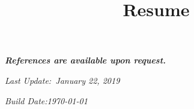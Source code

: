 \documentclass[12pt,a4paper]{moderncv}
\title{Resume}
\begin{document}
\maketitle

















\vspace{1cm}
\emph{\textbf{References are available upon request.}}

\vspace{0.5cm}
\emph{Last Update:\space~January 22, 2019}

\emph{Build Date:\space\today}
\end{document}
